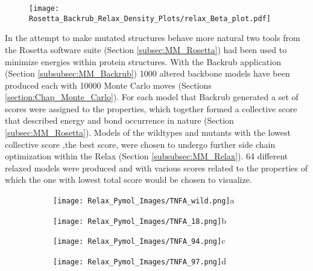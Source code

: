 	\newpage
		
	\begin{figure}[!ht]
		\centering
		\texttt{[image: Rosetta\_Backrub\_Relax\_Density\_Plots/relax\_Beta\_plot.pdf]}
		\caption[TNF-$\beta$ relax score plots]{}
		\label{fig:relax_TNFB_scores}
	\end{figure}

	\newpage
	
	In the attempt to make mutated structures behave more natural two tools from the Rosetta software suite (Section \ref{subsec:MM_Rosetta}) had been used to minimize energies within protein structures. With the Backrub application (Section \ref{subsubsec:MM_Backrub}) 1000 altered backbone models have been produced each with 10000 Monte Carlo moves (Sections \ref{section:Chap_Monte_Carlo}). For each model that Backrub generated a set of scores were assigned to the properties, which together formed a collective score that described energy and bond occurrence in nature (Section \ref{subsec:MM_Rosetta}). Models of the wildtypes and mutants with the lowest collective score ,the best score, were chosen to undergo further side chain optimization within the Relax (Section \ref{subsubsec:MM_Relax}). 64 different relaxed models were produced and with various scores related to the properties of which the one with lowest total score would be chosen to visualize. 
	
	\begin{figure}[!ht]
		\centering
		\begin{subfigure}{0.45\textwidth}
			\texttt{[image: Relax\_Pymol\_Images/TNFA\_wild.png]}{a}
			\label{fig:RES_TNFA_wild}
		\end{subfigure}
		\begin{subfigure}{0.45\textwidth}
			\texttt{[image: Relax\_Pymol\_Images/TNFA\_18.png]}{b}
			\label{fig:RES_TNFA_18}
		\end{subfigure}
		\begin{subfigure}{0.45\textwidth}
			\texttt{[image: Relax\_Pymol\_Images/TNFA\_94.png]}{c}
			\label{fig:RES_TNFA_94}
		\end{subfigure}
		\begin{subfigure}{0.45\textwidth}
			\texttt{[image: Relax\_Pymol\_Images/TNFA\_97.png]}{d}
			\label{fig:RES_TNFA_97}
			\end{subfigure}
		\caption[TNF-$\alpha$ relaxed and mutated models]{}
		\end{figure}
		\newpage
		
